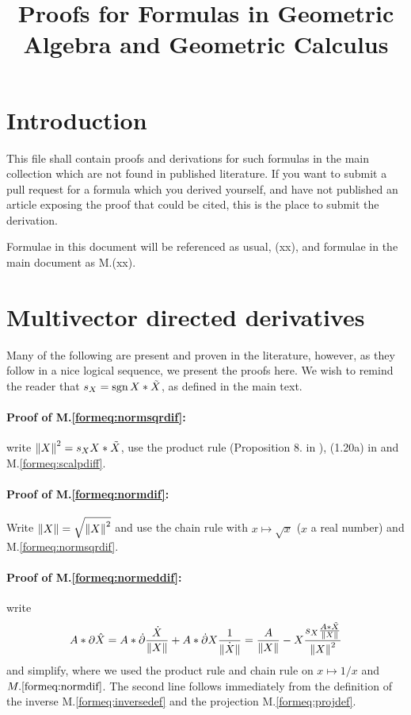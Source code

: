 \documentclass[a4paper,12pt]{article}
\title{Proofs for Formulas in Geometric Algebra and Geometric Calculus}
\author{}
\newcommand{\meqref}[1]{M.\eqref{form#1}}
\theoremstyle{definition}
\begin{document}
\maketitle

\section{Introduction}

This file shall contain proofs and derivations for such formulas in the main collection which are not found in published literature. If you want to submit a pull request for a formula which you derived yourself, and have not published an article exposing the proof that could be cited, this is the place to submit the derivation.

Formulae in this document will be referenced as usual, (xx), and formulae in the main document as M.(xx).
\section{Multivector directed derivatives}

Many of the following are present and proven in the literature, however, as they follow in a nice logical sequence, we present the proofs here.
We wish to remind the reader that $s_{X} = \operatorname{sgn}{X * \tilde{X}}$, as defined in the main text.

\paragraph{Proof of \meqref{eq:normsqrdif}:} write $\left\lVert X\right\rVert^2 = s_{X} X * \tilde{X}$, use the product rule (Proposition 8. in \cite{HitzerCalculus}), (1.20a) in \cite{CA2GC} and \meqref{eq:scalpdiff}.

\paragraph{Proof of \meqref{eq:normdif}:} Write $\left\lVert X\right\rVert = \sqrt{\left\lVert X\right\rVert^2}$ and use the chain rule with $x \mapsto \sqrt{x}$ ($x$ a real number) and \meqref{eq:normsqrdif}.

\paragraph{Proof of \meqref{eq:normeddif}:} write
\begin{equation}
A*\partial \hat{X} = A*\dot{\partial} \frac{\dot{X}}{\left\lVert X\right\rVert} + A*\dot{\partial} X \frac{1}{\dot{\left\lVert X\right\rVert}} = \frac{A}{\left\lVert X\right\rVert} - X \frac{s_{X} \frac{A * \tilde{X}}{\left\lVert X\right\rVert}}{\left\lVert X\right\rVert^2}
\end{equation}
and simplify, where we used the product rule and chain rule on $x \mapsto 1/x$ and $\meqref{eq:normdif}$.
The second line follows immediately from the definition of the inverse \meqref{eq:inversedef} and the projection \meqref{eq:projdef}.
\end{document}
